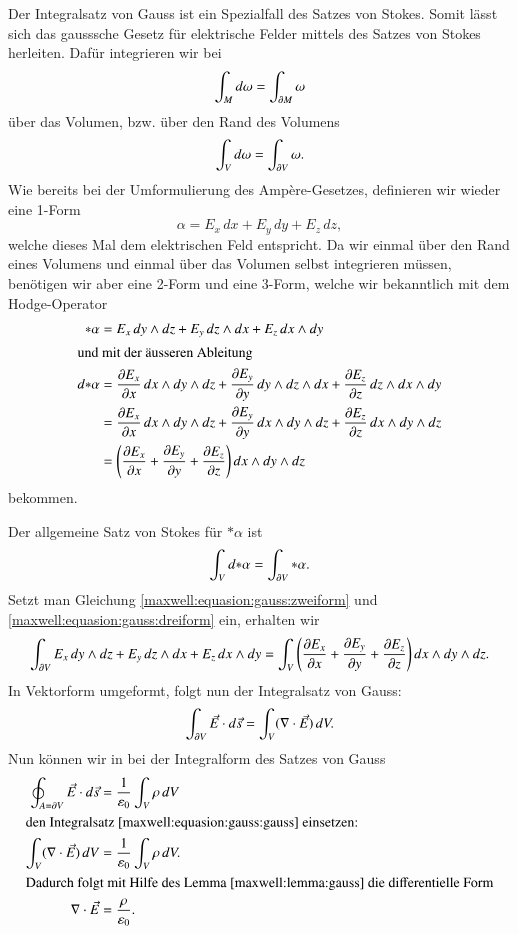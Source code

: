 Der Integralsatz von Gauss ist ein Spezialfall des Satzes von Stokes.
Somit lässt sich das gausssche Gesetz für elektrische Felder mittels des Satzes von Stokes herleiten.
Dafür integrieren wir bei
\[
\int_{M} d\omega
=
\int_{\d M} \omega
\]
über das Volumen, bzw. über den Rand des Volumens
\[
\int_{V} d\omega
=
\int_{\d V} \omega .
\]
Wie bereits bei der Umformulierung des Ampère-Gesetzes, definieren wir wieder eine 1-Form
\[
\alpha
=
E_x \, dx + E_y \, dy + E_z \, dz ,
\]
welche dieses Mal dem elektrischen Feld entspricht.
Da wir einmal über den Rand eines Volumens und einmal über das Volumen selbst integrieren müssen, benötigen wir aber eine 2-Form und eine 3-Form, welche wir bekanntlich mit dem Hodge-Operator
\begin{align}
	\ast\alpha
	&=
	E_x \, dy \wedge dz + E_y \, dz \wedge dx + E_z \, dx \wedge dy
	\label{maxwell:equasion:gauss:zweiform}
	\\
	\intertext{und mit der äusseren Ableitung}
	d{\ast}\alpha
	&=
	\frac{\d E_x}{\d x} \, dx \wedge dy \wedge dz +
	\frac{\d E_y}{\d y} \, dy \wedge dz \wedge dx +
	\frac{\d E_z}{\d z} \, dz \wedge dx \wedge dy
	\notag
	\\ 
	&=
	\frac{\d E_x}{\d x} \, dx \wedge dy \wedge dz +
	\frac{\d E_y}{\d y} \, dx \wedge dy \wedge dz +
	\frac{\d E_z}{\d z} \, dx \wedge dy \wedge dz
	\notag
	\\
	&=
	\left(
	\frac{\d E_x}{\d x} + \frac{\d E_y}{\d y} + \frac{\d E_z}{\d z}
	\right)
	dx \wedge dy \wedge dz 
	\label{maxwell:equasion:gauss:dreiform}
\end{align}
bekommen.

Der allgemeine Satz von Stokes für $\ast \alpha$ ist
\[
\int_{V} d {\ast} \alpha 
=
\int_{\d V} \ast \alpha .
\]
Setzt man Gleichung \eqref{maxwell:equasion:gauss:zweiform} und \eqref{maxwell:equasion:gauss:dreiform} ein, erhalten wir
\[
\int_{\d V}
E_x \, dy \wedge dz + E_y \, dz \wedge dx + E_z \, dx \wedge dy
=
\int_{V}
\left(
\frac{\d E_x}{\d x} + \frac{\d E_y}{\d y} + \frac{\d E_z}{\d z}
\right)
dx \wedge dy \wedge dz .
\]
In Vektorform umgeformt, folgt nun der Integralsatz von Gauss:
\begin{equation}
	\label{maxwell:equasion:gauss:gauss}
	\int_{\d V}
	\vec{E} \cdot d\vec{s}
	=
	\int_{V}
	(\nabla \cdot \vec{E}) \, dV .
\end{equation}
Nun können wir in bei der Integralform des Satzes von Gauss
\begin{align*}
	\oint_{A=\d V} \vec{E} \cdot d\vec{s}
	&=
	\frac{1}{\varepsilon_0}\int_{V} \rho \, dV
	\\
	\intertext{den Integralsatz \eqref{maxwell:equasion:gauss:gauss} einsetzen:}
	\int_{V}
	(\nabla \cdot \vec{E}) \, dV
	&=
	\frac{1}{\varepsilon_0}\int_{V} \rho \, dV .
	\\
	\intertext{Dadurch folgt mit Hilfe des Lemma \ref{maxwell:lemma:gauss} die differentielle Form}
	\nabla \cdot \vec{E}
	&=
	\frac{\rho}{\varepsilon_0}.
\end{align*} 

